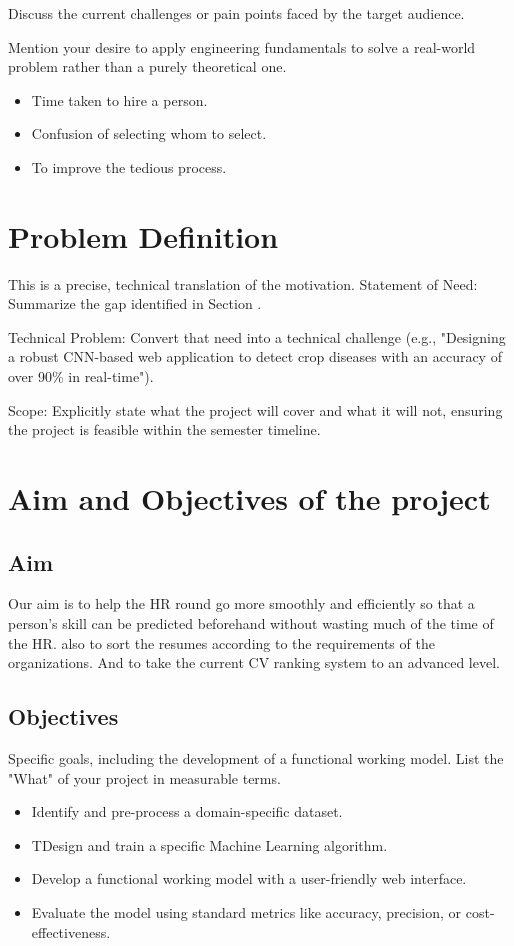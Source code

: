 Discuss the current challenges or pain points faced by the target audience.

Mention your desire to apply engineering fundamentals to solve a real-world problem rather than a purely theoretical one.
\begin{itemize}
	\item Time taken to hire a person. 
	\item Confusion of selecting whom to select.
	\item To improve the tedious process.	
\end{itemize}

\section{Problem Definition}

This is a precise, technical translation of the motivation.
Statement of Need: Summarize the gap identified in Section .

Technical Problem: Convert that need into a technical challenge (e.g., "Designing a robust CNN-based web application to detect crop diseases with an accuracy of over 90\% in real-time").

Scope: Explicitly state what the project will cover and what it will not, ensuring the project is feasible within the semester timeline.

\section{Aim and Objectives of the project}

\subsection{Aim}

Our aim is to help the HR round go more smoothly and efficiently so that a person’s skill can be predicted beforehand without wasting much of the time of the HR. also to sort the resumes according to the requirements of the organizations. And to take the current CV ranking system to an advanced level.

\subsection{Objectives}

Specific goals, including the development of a functional working model. List the "What" of your project in measurable terms.
\begin{itemize}
	\item Identify and pre-process a domain-specific dataset. 
	\item TDesign and train a specific Machine Learning algorithm.
	\item Develop a functional working model with a user-friendly web interface.
	\item Evaluate the model using standard metrics like accuracy, precision, or cost-effectiveness.	
\end{itemize}

